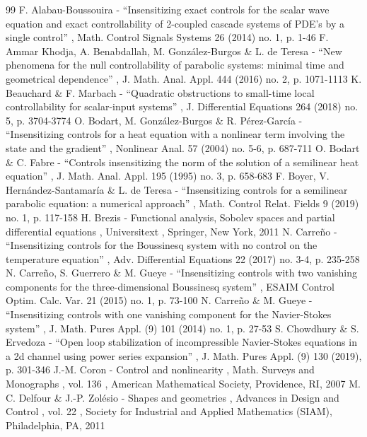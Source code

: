 \documentclass[11pt]{article}
\numberwithin{equation}{section}
\theoremstyle{definition}
\begin{document}
\begin{thebibliography}{99}
 F. Alabau-Boussouira - “Insensitizing exact controls for the scalar wave equation and exact controllability of 2-coupled cascade systems of PDE’s by a single control” , Math. Control Signals Systems 26 (2014) no. 1, p. 1-46
 F. Ammar Khodja, A. Benabdallah, M. González-Burgos \& L. de Teresa - “New phenomena for the null controllability of parabolic systems: minimal time and geometrical dependence” , J. Math. Anal. Appl. 444 (2016) no. 2, p. 1071-1113
 K. Beauchard \& F. Marbach - “Quadratic obstructions to small-time local controllability for scalar-input systems” , J. Differential Equations 264 (2018) no. 5, p. 3704-3774
 O. Bodart, M. González-Burgos \& R. Pérez-García - “Insensitizing controls for a heat equation with a nonlinear term involving the state and the gradient” , Nonlinear Anal. 57 (2004) no. 5-6, p. 687-711
 O. Bodart \& C. Fabre - “Controls insensitizing the norm of the solution of a semilinear heat equation” , J. Math. Anal. Appl. 195 (1995) no. 3, p. 658-683
 F. Boyer, V. Hernández-Santamaría \& L. de Teresa - “Insensitizing controls for a semilinear parabolic equation: a numerical approach” , Math. Control Relat. Fields 9 (2019) no. 1, p. 117-158
 H. Brezis - Functional analysis, Sobolev spaces and partial differential equations , Universitext , Springer, New York, 2011
 N. Carreño - “Insensitizing controls for the Boussinesq system with no control on the temperature equation” , Adv. Differential Equations 22 (2017) no. 3-4, p. 235-258
 N. Carreño, S. Guerrero \& M. Gueye - “Insensitizing controls with two vanishing components for the three-dimensional Boussinesq system” , ESAIM Control Optim. Calc. Var. 21 (2015) no. 1, p. 73-100
 N. Carreño \& M. Gueye - “Insensitizing controls with one vanishing component for the Navier-Stokes system” , J. Math. Pures Appl. (9) 101 (2014) no. 1, p. 27-53
 S. Chowdhury \& S. Ervedoza - “Open loop stabilization of incompressible Navier-Stokes equations in a 2d channel using power series expansion” , J. Math. Pures Appl. (9) 130 (2019), p. 301-346
 J.-M. Coron - Control and nonlinearity , Math. Surveys and Monographs , vol. 136 , American Mathematical Society, Providence, RI, 2007
 M. C. Delfour \& J.-P. Zolésio - Shapes and geometries , Advances in Design and Control , vol. 22 , Society for Industrial and Applied Mathematics (SIAM), Philadelphia, PA, 2011

\end{thebibliography}
\end{document}
